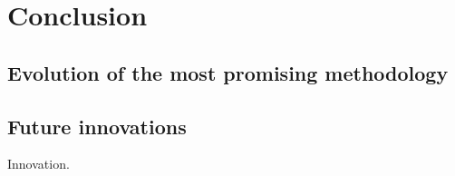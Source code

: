 \documentclass[a4paper]{article}
\begin{document}
\section{Conclusion}%
\label{sec:conclusion}

\subsection{Evolution of the most promising methodology}%
\label{sub:evolution_of_the_most_promising_methodology}



\subsection{Future innovations}%
\label{sub:future_innovations}
Innovation.



\end{document}
